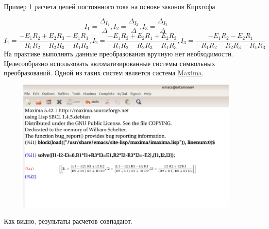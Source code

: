 \documentclass[10pt, pdf, hyperref={unicode},handout]{beamer}
\begin{document}
\begin{frame}{Пример 1  расчета цепей постоянного тока на основе законов Кирхгофа}
  \begin{block}

    \small{

      $$I_1=\frac{\Delta_{I_1}}{\Delta}, I_2=\frac{\Delta_{I_2}}{\Delta}, I_3=\frac{\Delta_{I_3}}{\Delta}$$
      $$I_1=\frac{-E_1R_2+E_2R_3-E_1R_3}{-R_1R_2-R_2R_3-R_1R_3}, I_2=\frac{-E_1R_3+E_2R_1+E_2R_3}{-R_1R_2-R_2R_3-R_1R_3}, I_3=\frac{-E_1R_2-E_2R_1}{-R_1R_2-R_2R_3-R_1R_3}$$
      На практике выполнять данные преобразования вручную нет необходимости. Целесообразно использовать автоматизированные системы символьных преобразований. Одной из таких систем является система \href{https://ru.wikipedia.org/wiki/Maxima}{Maxima}.
      \begin{figure}[htb] 
    \centering
    \includegraphics [scale=0.7]{ris6.eps}
  \end{figure}
  Как видно, результаты расчетов совпадают.
}

  \end{block}
  
\end{frame}
\end{document}
